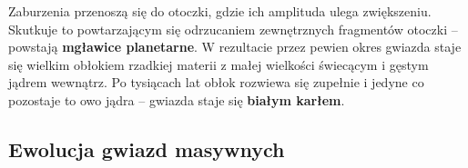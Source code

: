\documentclass[../index.tex]{subfiles}
\begin{document}
            Zaburzenia przenoszą się do otoczki, gdzie ich amplituda ulega zwiększeniu. Skutkuje to powtarzającym się odrzucaniem zewnętrznych fragmentów otoczki – powstają \textbf{mgławice planetarne}. W rezultacie przez pewien okres gwiazda staje się wielkim obłokiem rzadkiej materii z małej wielkości świecącym i gęstym jądrem wewnątrz. Po tysiącach lat obłok rozwiewa się zupełnie i jedyne co pozostaje to owo jądra – gwiazda staje się \textbf{białym karłem}.
        \subsection{Ewolucja gwiazd masywnych}
            
\end{document}
